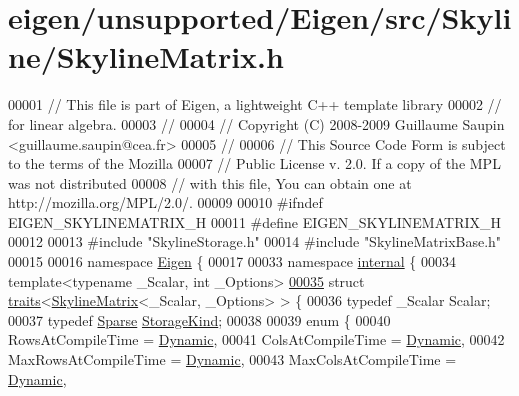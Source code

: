 \hypertarget{eigen_2unsupported_2_eigen_2src_2_skyline_2_skyline_matrix_8h_source}{}\section{eigen/unsupported/\+Eigen/src/\+Skyline/\+Skyline\+Matrix.h}
\label{eigen_2unsupported_2_eigen_2src_2_skyline_2_skyline_matrix_8h_source}

\begin{DoxyCode}
00001 \textcolor{comment}{// This file is part of Eigen, a lightweight C++ template library}
00002 \textcolor{comment}{// for linear algebra.}
00003 \textcolor{comment}{//}
00004 \textcolor{comment}{// Copyright (C) 2008-2009 Guillaume Saupin <guillaume.saupin@cea.fr>}
00005 \textcolor{comment}{//}
00006 \textcolor{comment}{// This Source Code Form is subject to the terms of the Mozilla}
00007 \textcolor{comment}{// Public License v. 2.0. If a copy of the MPL was not distributed}
00008 \textcolor{comment}{// with this file, You can obtain one at http://mozilla.org/MPL/2.0/.}
00009 
00010 \textcolor{preprocessor}{#ifndef EIGEN\_SKYLINEMATRIX\_H}
00011 \textcolor{preprocessor}{#define EIGEN\_SKYLINEMATRIX\_H}
00012 
00013 \textcolor{preprocessor}{#include "SkylineStorage.h"}
00014 \textcolor{preprocessor}{#include "SkylineMatrixBase.h"}
00015 
00016 \textcolor{keyword}{namespace }\hyperlink{namespace_eigen}{Eigen} \{ 
00017 
00033 \textcolor{keyword}{namespace }\hyperlink{namespaceinternal}{internal} \{
00034 \textcolor{keyword}{template}<\textcolor{keyword}{typename} \_Scalar, \textcolor{keywordtype}{int} \_Options>
\hyperlink{struct_eigen_1_1internal_1_1traits_3_01_skyline_matrix_3_01___scalar_00_01___options_01_4_01_4}{00035} \textcolor{keyword}{struct }\hyperlink{struct_eigen_1_1internal_1_1traits}{traits}<\hyperlink{class_eigen_1_1_skyline_matrix}{SkylineMatrix}<\_Scalar, \_Options> > \{
00036     \textcolor{keyword}{typedef} \_Scalar Scalar;
00037     \textcolor{keyword}{typedef} \hyperlink{struct_eigen_1_1_sparse}{Sparse} \hyperlink{struct_eigen_1_1_sparse}{StorageKind};
00038 
00039     \textcolor{keyword}{enum} \{
00040         RowsAtCompileTime = \hyperlink{namespace_eigen_ad81fa7195215a0ce30017dfac309f0b2}{Dynamic},
00041         ColsAtCompileTime = \hyperlink{namespace_eigen_ad81fa7195215a0ce30017dfac309f0b2}{Dynamic},
00042         MaxRowsAtCompileTime = \hyperlink{namespace_eigen_ad81fa7195215a0ce30017dfac309f0b2}{Dynamic},
00043         MaxColsAtCompileTime = \hyperlink{namespace_eigen_ad81fa7195215a0ce30017dfac309f0b2}{Dynamic},

\end{DoxyCode}
